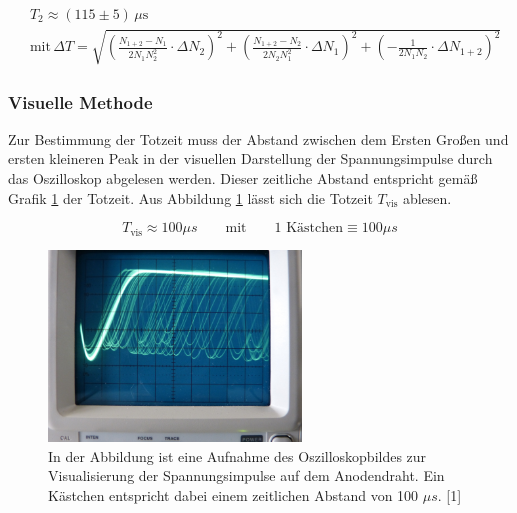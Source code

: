 \documentclass[titlepage = firstcover]{scrartcl}
\begin{document}
                \begin{align*}
                    &T_2 \approx \left(115 \pm 5\right) \, \mu \text{s} \\
                    &\text{mit} \, \Delta T = \sqrt{\left(\frac{N_{1+2}-N_1}{2N_1N_2^2} \cdot \Delta N_2\right)^2 + \left(\frac{N_{1+2}-N_2}{2N_2N_1^2} \cdot \Delta N_1\right)^2 + \left(-\frac{1}{2N_1N_2} \cdot \Delta N_{1+2}\right)^2}
                \end{align*}
                
            \subsubsection*{Visuelle Methode}   
                Zur Bestimmung der Totzeit muss der Abstand zwischen dem Ersten Großen und ersten kleineren Peak in der visuellen Darstellung der Spannungsimpulse durch das Oszilloskop abgelesen 
                werden. Dieser zeitliche Abstand entspricht gemäß Grafik \ref{fig:Zeit} der Totzeit.  Aus Abbildung \ref{fig:Zeit} lässt sich die Totzeit $T_{\text{vis}}$ ablesen.

                \begin{equation*}
                    T_{\text{vis}} \approx 100 \mu s \qquad \text{mit} \qquad \text{1 Kästchen} \equiv 100 \mu s
                \end{equation*}

                \FloatBarrier

                \begin{figure}[h]
                  \centering
                  \includegraphics[width = 0.6\textwidth]{Bilder/Visuell.png}
                  \caption{In der Abbildung ist eine Aufnahme des Oszilloskopbildes zur Visualisierung der Spannungsimpulse auf dem Anodendraht. Ein Kästchen entspricht dabei einem zeitlichen Abstand von 100 $\mu s$. [1]}
                  \label{fig:Zeit}
                \end{figure}
\end{document}
